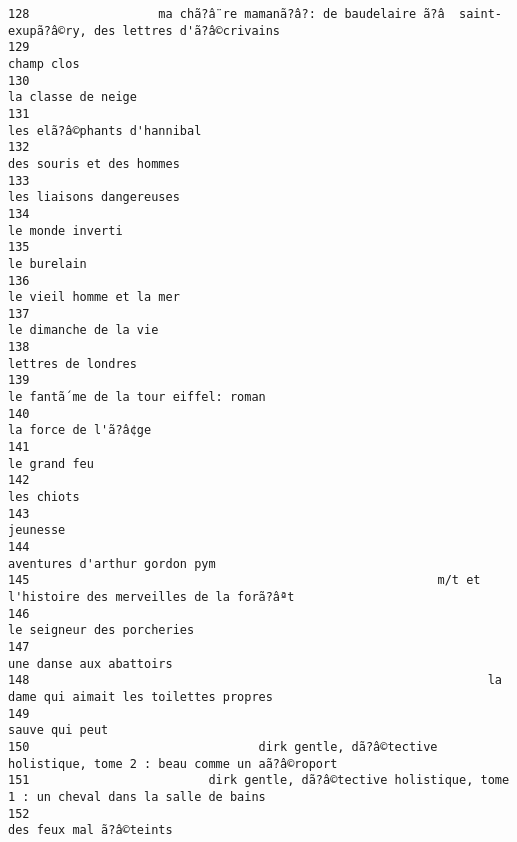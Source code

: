 \documentclass[
]{report}
\begin{document}
\begin{verbatim}
128                  ma chã?â¨re mamanã?â?: de baudelaire ã?â  saint-exupã?â©ry, des lettres d'ã?â©crivains
129                                                                                              champ clos
130                                                                                      la classe de neige
131                                                                             les elã?â©phants d'hannibal
132                                                                                des souris et des hommes
133                                                                                les liaisons dangereuses
134                                                                                        le monde inverti
135                                                                                             le burelain
136                                                                                le vieil homme et la mer
137                                                                                   le dimanche de la vie
138                                                                                      lettres de londres
139                                                                    le fantã´me de la tour eiffel: roman
140                                                                                    la force de l'ã?â¢ge
141                                                                                            le grand feu
142                                                                                              les chiots
143                                                                                                jeunesse
144                                                                           aventures d'arthur gordon pym
145                                                         m/t et l'histoire des merveilles de la forã?âªt
146                                                                              le seigneur des porcheries
147                                                                                 une danse aux abattoirs
148                                                                la dame qui aimait les toilettes propres
149                                                                                          sauve qui peut
150                                dirk gentle, dã?â©tective holistique, tome 2 : beau comme un aã?â©roport
151                         dirk gentle, dã?â©tective holistique, tome 1 : un cheval dans la salle de bains
152                                                                                 des feux mal ã?â©teints

\end{verbatim}
\end{document}
